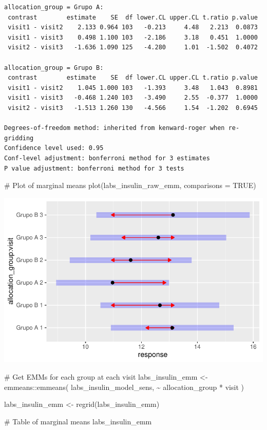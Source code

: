 \documentclass[
  letterpaper,
  DIV=11,
  numbers=noendperiod]{scrartcl}
\newenvironment{Shaded}{\begin{snugshade}}{\end{snugshade}}
\newcommand{\AttributeTok}[1]{\textcolor[rgb]{0.40,0.45,0.13}{#1}}
\newcommand{\CommentTok}[1]{\textcolor[rgb]{0.37,0.37,0.37}{#1}}
\newcommand{\ConstantTok}[1]{\textcolor[rgb]{0.56,0.35,0.01}{#1}}
\newcommand{\FunctionTok}[1]{\textcolor[rgb]{0.28,0.35,0.67}{#1}}
\newcommand{\NormalTok}[1]{\textcolor[rgb]{0.00,0.23,0.31}{#1}}
\newcommand{\OtherTok}[1]{\textcolor[rgb]{0.00,0.23,0.31}{#1}}
\newcommand{\SpecialCharTok}[1]{\textcolor[rgb]{0.37,0.37,0.37}{#1}}
\begin{document}
\begin{verbatim}
allocation_group = Grupo A:
 contrast        estimate    SE  df lower.CL upper.CL t.ratio p.value
 visit1 - visit2    2.133 0.964 103   -0.213     4.48   2.213  0.0873
 visit1 - visit3    0.498 1.100 103   -2.186     3.18   0.451  1.0000
 visit2 - visit3   -1.636 1.090 125   -4.280     1.01  -1.502  0.4072

allocation_group = Grupo B:
 contrast        estimate    SE  df lower.CL upper.CL t.ratio p.value
 visit1 - visit2    1.045 1.000 103   -1.393     3.48   1.043  0.8981
 visit1 - visit3   -0.468 1.240 103   -3.490     2.55  -0.377  1.0000
 visit2 - visit3   -1.513 1.260 130   -4.566     1.54  -1.202  0.6945

Degrees-of-freedom method: inherited from kenward-roger when re-gridding 
Confidence level used: 0.95 
Conf-level adjustment: bonferroni method for 3 estimates 
P value adjustment: bonferroni method for 3 tests 
\end{verbatim}

\begin{Shaded}
\begin{Highlighting}[]
\CommentTok{\# Plot of marginal means}
\FunctionTok{plot}\NormalTok{(labs\_insulin\_raw\_emm, }\AttributeTok{comparisons =} \ConstantTok{TRUE}\NormalTok{)}
\end{Highlighting}
\end{Shaded}

\includegraphics{Outcomes_V1V2V3_files/figure-pdf/labs_insulin_raw_emm-1.pdf}

\begin{Shaded}
\begin{Highlighting}[]
\CommentTok{\# Get EMMs for each group at each visit}
\NormalTok{labs\_insulin\_emm }\OtherTok{\textless{}{-}}\NormalTok{ emmeans}\SpecialCharTok{::}\FunctionTok{emmeans}\NormalTok{(}
\NormalTok{    labs\_insulin\_model\_sens, }
    \SpecialCharTok{\textasciitilde{}}\NormalTok{ allocation\_group }\SpecialCharTok{*}\NormalTok{ visit}
\NormalTok{)}

\NormalTok{labs\_insulin\_emm }\OtherTok{\textless{}{-}} \FunctionTok{regrid}\NormalTok{(labs\_insulin\_emm)}

\CommentTok{\# Table of marginal means}
\NormalTok{labs\_insulin\_emm}
\end{Highlighting}
\end{Shaded}
\end{document}
